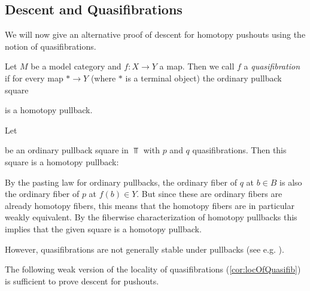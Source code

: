\subsection*{Descent and Quasifibrations}
We will now give an alternative proof of descent for homotopy pushouts using the notion of quasifibrations.
\begin{definition}[Quasifibration]
    Let $M$ be a model category and $f\colon X\to Y$ a map.
    Then we call $f$ a \emph{quasifibration} if for every map $*\to Y$ (where $*$ is a terminal object) the ordinary pullback square
    \begin{center}
    \end{center}
    is a homotopy pullback.
\end{definition}
\begin{remark}
    Let 
    \begin{center}
    \end{center}
    be an ordinary pullback square in $\Top$ with $p$ and $q$ quasifibrations.
    Then this square is a homotopy pullback:
    
    By the pasting law for ordinary pullbacks, the ordinary fiber of $q$ at $b\in B$ is also the ordinary fiber of $p$ at $f(b)\in Y$.
    But since these are ordinary fibers are already homotopy fibers, this means that the homotopy fibers are in particular weakly equivalent.
    By the fiberwise characterization of homotopy pullbacks this implies that the given square is a homotopy pullback.

    However, quasifibrations are not generally stable under pullbacks (see e.g. \cite[Example 2.7.6]{cubical_htpy_theory}).
\end{remark}
The following weak version of the locality of quasifibrations (\cref{cor:locOfQuasifib}) is sufficient to prove descent for pushouts.
